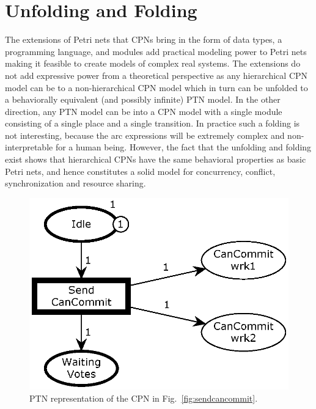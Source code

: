 \section{Unfolding and Folding}

The extensions of Petri nets that CPNs bring in the form of data
types, a programming language, and modules add practical modeling
power to Petri nets making it feasible to create models of complex
real systems. The extensions do not add expressive power from a
theoretical perspective as any hierarchical CPN model can be
 to a non-hierarchical CPN model which in turn can
be unfolded to a behaviorally equivalent (and possibly infinite) PTN
model. In the other direction, any PTN model can be 
into a CPN model with a single module consisting of a single place and
a single transition. In practice such a folding is not interesting,
because the arc expressions will be extremely complex and
non-interpretable for a human being. However, the fact that the
unfolding and folding exist shows that hierarchical CPNs have the same
behavioral properties as basic Petri nets, and hence constitutes a
solid model for concurrency, conflict, synchronization and resource
sharing.




\begin{figure}[b]
\centering
\includegraphics[scale=.45]{figures/PTSendCanCommit.eps}
\caption{PTN representation of the CPN in Fig.~\ref{fig:sendcancommit}.}
\label{fig:sendcancommitunfold}
\end{figure}

